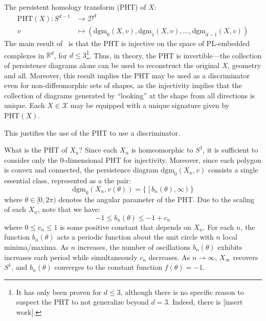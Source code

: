 \documentclass[10pt]{article}
\begin{document}
The persistent homology transform (PHT) of $X$: 
\begin{align}
	\mathrm{PHT}(X) : S^{d-1} &\to \mathcal{D}^d \\
	v &\mapsto \left(\mathrm{dgm}_0(X, v), \mathrm{dgm}_1(X, v), \dots, \mathrm{dgm}_{d-1}(X, v)\right)
\end{align}
The main result of~\cite{} is that the PHT is injective on the space of PL-embedded complexes in $\mathbb{R}^d$, for $d \leq 3$\footnote{It has only been proven for $d \leq 3$, although there is no specific reason to suspect the PHT to not generalize beyond $d = 3$. Indeed, there is [insert work].}.
Thus, in theory, the PHT is invertible---the collection of persistence diagrams alone can be used to reconstruct the original $X$, geometry and all. 
Moreover, this result implies the PHT may be used as a discriminator even for non-diffeomorphic sets of shapes, as the injectivity implies that the collection of diagrams generated by ``looking'' at the shape from all directions is unique. Each $X \in \mathcal{X}$ may be equipped with a unique signature given by $\mathrm{PHT}(X)$. 

This justifies the use of the PHT to use a discriminator. 


 







What is the PHT of $X_n$? Since each $X_n$ is homeomorphic to $S^1$, it is sufficient to consider only the $0$-dimensional PHT for injectivity. Moreover, since each polygon is convex and connected, the persistence diagram $\mathrm{dgm}_0(X_n, v)$ consists a single essential class, represented as a the pair: 
$$ \mathrm{dgm}_0(X_n, v(\theta)) = \{ \; [\,b_n(\theta), \infty \,) \; \}$$
where $\theta \in [0, 2 \pi )$ denotes the angular parameter of the PHT. Due to the scaling of each $X_n$, note that we have:
$$
-1 \leq b_n(\theta) \leq -1 + c_n
$$
where $0 \leq c_n \leq 1$ is some positive constant that depends on $X_n$. For each $n$, the function $b_n(\theta)$ acts a periodic function about the unit circle with $n$ local minima/maxima. As $n$ increases, the number of oscillations $b_n(\theta)$ exhibits increases each period while simultaneously $c_n$ decreases. As $n \to \infty$, $X_\infty$ recovers $S^1$, and $b_n(\theta)$ converges to the constant function $f(\theta) = -1$.   
\end{document}
